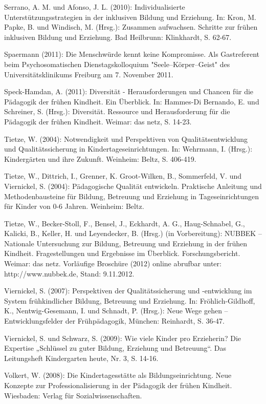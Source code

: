 Serrano, A. M. und Afonso, J. L. (2010): Individualisierte Unterstützungsstrategien in der inklusiven Bildung und Erziehung. In: Kron, M. Papke, B. und Windisch, M. (Hrsg.): Zusammen aufwachsen. Schritte zur frühen inklusiven Bildung und Erziehung. Bad Heilbrunn: Klinkhardt, S. 62-67.

Spaermann (2011): Die Menschwürde kennt keine Kompromisse. Als Gastreferent beim Psychosomatischen Dienstagskolloquium "Seele–Körper–Geist" des Universitätsklinikums Freiburg am 7. November 2011.

Speck-Hamdan, A. (2011): Diversität - Herausforderungen und Chancen für die Pädagogik der frühen Kindheit. Ein Überblick. In: Hammes-Di Bernando, E. und Schreiner, S. (Hrsg.): Diversität. Ressource und Herausforderung für die Pädagogik der frühen Kindheit. Weimar: das netz, S. 14-23.

Tietze, W. (2004): Notwendigkeit und Perspektiven von Qualitätsentwicklung und Qualitätssicherung in Kindertageseinrichtungen. In: Wehrmann, I. (Hrsg.): Kindergärten und ihre Zukunft. Weinheim: Beltz, S. 406-419.

Tietze, W., Dittrich, I., Grenner, K. Groot-Wilken, B., Sommerfeld, V. und Viernickel, S. (2004): Pädagogische Qualität entwickeln. Praktische Anleitung und Methodenbausteine für Bildung, Betreuung und Erziehung in Tageseinrichtungen für Kinder von 0-6 Jahren. Weinheim: Beltz.

Tietze, W., Becker-Stoll, F., Bensel, J., Eckhardt, A. G., Haug-Schnabel, G., Kalicki, B., Keller, H. und Leyendecker, B. (Hrsg.) (in Vorbereitung): NUBBEK -- Nationale Untersuchung zur Bildung, Betreuung und Erziehung in der frühen Kindheit.
Fragestellungen und Ergebnisse im Überblick. Forschungsbericht. Weimar: das netz. Vorläufige Broschüre (2012) online abrufbar unter: http://www.nubbek.de, Stand:  9.11.2012.

Viernickel, S. (2007): Perspektiven der Qualitätssicherung und -entwicklung im System frühkindlicher Bildung, Betreuung und Erziehung. In: Fröhlich-Gildhoff, K., Nentwig-Gesemann, I. und Schnadt, P. (Hrsg.): Neue Wege gehen -- Entwicklungsfelder der Frühpädagogik,  München: Reinhardt, S. 36-47. 

Viernickel, S. und Schwarz, S. (2009): Wie viele Kinder pro Erzieherin? Die Expertise „Schlüssel zu guter Bildung, Erziehung und Betreuung“. Das Leitungsheft Kindergarten heute, Nr. 3, S. 14-16.

Volkert, W. (2008): Die Kindertagesstätte als Bildungseinrichtung. Neue Konzepte zur Professionalisierung in der Pädagogik der frühen Kindheit. Wiesbaden: Verlag für Sozialwissenschaften.

